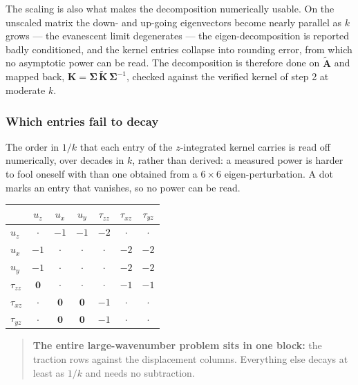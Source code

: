 \documentclass[11pt,a4paper]{article}
\newcommand{\bA}{\mathbf{A}}
\newcommand{\bK}{\mathbf{K}}
\newcommand{\bSig}{\boldsymbol{\Sigma}}
\begin{document}
The scaling is also what makes the decomposition numerically usable.  On the
unscaled matrix the down- and up-going eigenvectors become nearly parallel as
$k$ grows --- the evanescent limit degenerates --- the eigen-decomposition is
reported badly conditioned, and the kernel entries collapse into rounding error,
from which no asymptotic power can be read.  The decomposition is therefore done
on $\widetilde{\bA}$ and mapped back, $\bK = \bSig\,\widetilde{\bK}\,\bSig^{-1}$,
checked against the verified kernel of step 2 at moderate $k$.

\subsubsection{Which entries fail to decay}

The order in $1/k$ that each entry of the $z$-integrated kernel carries is read
off numerically, over decades in $k$, rather than derived: a measured power is
harder to fool oneself with than one obtained from a $6\times6$
eigen-perturbation.  A dot marks an entry that vanishes, so no power can be read.

\begin{center}
\begin{tabular}{l|cccccc}
\toprule
 & $u_z$ & $u_x$ & $u_y$ & $\tau_{zz}$ & $\tau_{xz}$ & $\tau_{yz}$\\
\midrule
$u_z$        & $\cdot$ & $-1$ & $-1$ & $-2$ & $\cdot$ & $\cdot$\\
$u_x$        & $-1$ & $\cdot$ & $\cdot$ & $\cdot$ & $-2$ & $-2$\\
$u_y$        & $-1$ & $\cdot$ & $\cdot$ & $\cdot$ & $-2$ & $-2$\\
$\tau_{zz}$  & $\mathbf{0}$ & $\cdot$ & $\cdot$ & $\cdot$ & $-1$ & $-1$\\
$\tau_{xz}$  & $\cdot$ & $\mathbf{0}$ & $\mathbf{0}$ & $-1$ & $\cdot$ & $\cdot$\\
$\tau_{yz}$  & $\cdot$ & $\mathbf{0}$ & $\mathbf{0}$ & $-1$ & $\cdot$ & $\cdot$\\
\bottomrule
\end{tabular}
\end{center}

\begin{quote}
\textbf{The entire large-wavenumber problem sits in one block:} the traction rows
against the displacement columns.  Everything else decays at least as $1/k$ and
needs no subtraction.
\end{quote}
\end{document}
